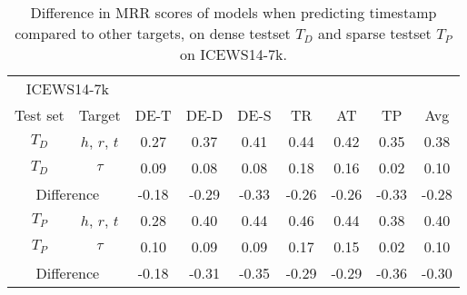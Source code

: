 \begin{table}[htb]
\centering
\begin{minipage}{\columnwidthcaption}
\centering
\caption{Difference in MRR scores of models when predicting timestamp compared to other targets, on dense testset $T_D$ and sparse testset $T_P$ on \mbox{ICEWS14-7k}.}
\label{tab:time_density_timestamp_icews14}
\end{minipage}
\vspace{-3mm}

\begin{tabular}{cc|cccccc|c} \hline
\multicolumn{2}{c|}{\mbox{ICEWS14-7k}} & & & & & & & \\
Test set & Target & DE-T & DE-D & DE-S & TR & AT & TP & Avg \\ \hline 
$T_D$ & $h$, $r$, $t$ & 
0.27 & 0.37 & 0.41 & 0.44 & 0.42 & 0.35 & 0.38 \\
$T_D$ & $\tau$        & 
0.09 & 0.08 & 0.08 & 0.18 & 0.16 & 0.02 & 0.10 \\ \hline
\multicolumn{2}{c|}{Difference} & 
-0.18 & -0.29 & -0.33 & -0.26 & -0.26 & -0.33 & -0.28 \\ \hline\hline
$T_P$ & $h$, $r$, $t$ & 
0.28 & 0.40 & 0.44 & 0.46 & 0.44 & 0.38 & 0.40 \\
$T_P$ & $\tau$        & 
0.10 & 0.09 & 0.09 & 0.17 & 0.15 & 0.02 & 0.10 \\ \hline 
\multicolumn{2}{c|}{Difference} & 
-0.18 & -0.31 & -0.35 & -0.29 & -0.29 & -0.36 & -0.30\\ \hline
\end{tabular}

\end{table}

